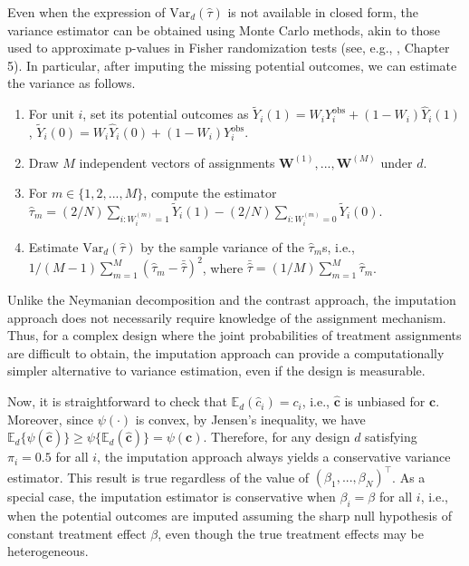\documentclass[12pt]{article}
\newcommand{\Var}{{\text{Var}}}
\newcommand{\E}{{\mathbb{E}}}
\begin{document}
Even when the expression of $\Var_d(\hat{\tau})$ is not available in closed form, the variance estimator can be obtained using Monte Carlo methods, akin to those used to approximate p-values in Fisher randomization tests (see, e.g., \cite{imbens2015causal}, Chapter 5). In particular, after imputing the missing potential outcomes, we can estimate the variance as follows.
\begin{enumerate}
    \item For unit $i$, set its potential outcomes as
        $\tilde{Y}_i(1) = W_i Y^{\text{obs}}_i + (1-W_i) \hat{Y}_i(1)$, $\tilde{Y}_i(0) = W_i\hat{Y}_i(0) + (1-W_i)Y^{\text{obs}}_i$.  

    \item Draw $M$ independent vectors of assignments $\bm{W}^{(1)},...,\bm{W}^{(M)}$ under $d$.
    
    \item For $m \in \{1,2,...,M\}$, compute the estimator $\hat{\tau}_m = (2/N)\sum_{i:W^{(m)}_i = 1}\tilde{Y}_i(1) - (2/N)\sum_{i:W^{(m)}_i = 0}\tilde{Y}_i(0)$.

\item Estimate $\Var_d(\hat{\tau})$ by the sample variance of the $\hat{\tau}_m$s, i.e.,  $1/(M-1)\sum_{m=1}^{M}(\hat{\tau}_m - \bar{\hat{\tau}})^2$, where $\bar{\hat{\tau}} = (1/M)\sum_{m = 1}^{M}\hat{\tau}_m$.
\end{enumerate}
Unlike the Neymanian decomposition and the contrast approach, the imputation approach does not necessarily require knowledge of the assignment mechanism. Thus, for a complex design where the joint probabilities of treatment assignments are difficult to obtain, the imputation approach can provide a computationally simpler alternative to variance estimation, even if the design is measurable.

Now, it is straightforward to check that $\E_d(\hat{c}_i) = c_i$, i.e., $\hat{\bm{c}}$ is unbiased for $\bm{c}$. Moreover, since $\psi(\cdot)$ is convex, by Jensen's inequality, we have $\E_d\{\psi(\hat{\bm{c}})\} \geq \psi\{\E_d(\hat{\bm{c}})\} = \psi(\bm{c})$. Therefore, for any design $d$ satisfying $\pi_i = 0.5$ for all $i$, the imputation approach always yields a conservative variance estimator. This result is true regardless of the value of $(\beta_1,...,\beta_N)^\top$. As a special case, the imputation estimator is conservative when $\beta_i = \beta$ for all $i$, i.e., when the potential outcomes are imputed assuming the sharp null hypothesis of constant treatment effect $\beta$, even though the true treatment effects may be heterogeneous.
\end{document}
